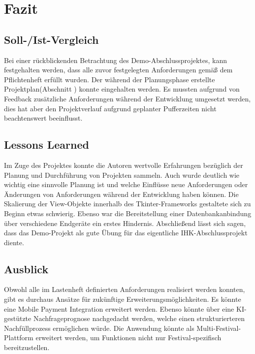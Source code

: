 \section{Fazit} 
\label{sec:Fazit}

\subsection{Soll-/Ist-Vergleich}
\label{sec:SollIstVergleich}
Bei einer rückblickenden Betrachtung des Demo-Abschlussprojektes, kann festgehalten werden, dass alle zuvor festgelegten Anforderungen gemäß dem Pflichtenheft erfüllt wurden.
Der während der Planungsphase erstellte Projektplan(Abschnitt ) konnte eingehalten werden. Es mussten aufgrund von Feedback zusätzliche Anforderungen 
während der Entwicklung umgesetzt werden, dies hat aber den Projektverlauf aufgrund geplanter Pufferzeiten nicht beachtenswert beeinflusst.

\subsection{Lessons Learned}
\label{sec:LessonsLearned}
Im Zuge des Projektes konnte die Autoren wertvolle Erfahrungen bezüglich der Planung und Durchführung von Projekten sammeln. Auch wurde deutlich wie wichtig eine sinnvolle
Planung ist und welche Einflüsse neue Anforderungen oder Änderungen von Anforderungen während der Entwicklung haben können. Die Skalierung der View-Objekte innerhalb des
Tkinter-Frameworks gestaltete sich zu Beginn etwas schwierig. Ebenso war die Bereitstellung einer Datenbankanbindung über verschiedene Endgeräte ein erstes Hindernis.
Abschließend lässt sich sagen, dass das Demo-Projekt als gute Übung für das eigentliche IHK-Abschlussprojekt diente. 

\subsection{Ausblick}
\label{sec:Ausblick}
Obwohl alle im Lastenheft definierten Anforderungen realisiert werden konnten, gibt es durchaus Ansätze für zukünftige Erweiterungsmöglichkeiten. Es könnte eine Mobile
Payment Integration erweitert werden. Ebenso könnte über eine \acs{KI}-gestützte Nachfrageprognose nachgedacht werden, welche einen strukturierteren Nachfüllprozess ermöglichen
würde. Die Anwendung könnte als  Multi-Festival-Plattform erweitert werden, um Funktionen nicht nur Festival-spezifisch bereitzustellen. 
